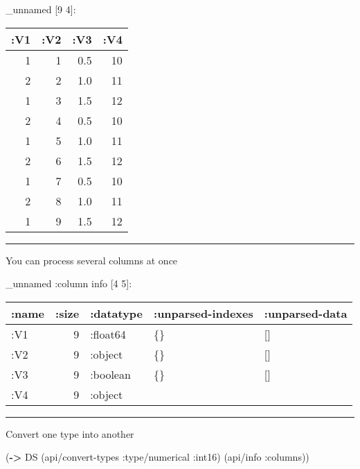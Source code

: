 \documentclass[]{article}
\newenvironment{Shaded}{\begin{snugshade}}{\end{snugshade}}
\newcommand{\KeywordTok}[1]{\textcolor[rgb]{0.13,0.29,0.53}{\textbf{#1}}}
\newcommand{\FloatTok}[1]{\textcolor[rgb]{0.00,0.00,0.81}{#1}}
\newcommand{\VariableTok}[1]{\textcolor[rgb]{0.00,0.00,0.00}{#1}}
\newcommand{\AttributeTok}[1]{\textcolor[rgb]{0.77,0.63,0.00}{#1}}
\newcommand{\NormalTok}[1]{#1}
\begin{document}
\_unnamed {[}9 4{]}:

\begin{longtable}[]{@{}rrrr@{}}
\toprule
:V1 & :V2 & :V3 & :V4\tabularnewline
\midrule
\endhead
1 & 1 & 0.5 & 10\tabularnewline
2 & 2 & 1.0 & 11\tabularnewline
1 & 3 & 1.5 & 12\tabularnewline
2 & 4 & 0.5 & 10\tabularnewline
1 & 5 & 1.0 & 11\tabularnewline
2 & 6 & 1.5 & 12\tabularnewline
1 & 7 & 0.5 & 10\tabularnewline
2 & 8 & 1.0 & 11\tabularnewline
1 & 9 & 1.5 & 12\tabularnewline
\bottomrule
\end{longtable}

\begin{center}\rule{0.5\linewidth}{0.5pt}\end{center}

You can process several columns at once

\begin{Shaded}
\end{Shaded}

\_unnamed :column info {[}4 5{]}:

\begin{longtable}[]{@{}lrlll@{}}
\toprule
:name & :size & :datatype & :unparsed-indexes &
:unparsed-data\tabularnewline
\midrule
\endhead
:V1 & 9 & :float64 & \{\} & {[}{]}\tabularnewline
:V2 & 9 & :object & \{\} & {[}{]}\tabularnewline
:V3 & 9 & :boolean & \{\} & {[}{]}\tabularnewline
:V4 & 9 & :object & &\tabularnewline
\bottomrule
\end{longtable}

\begin{center}\rule{0.5\linewidth}{0.5pt}\end{center}

Convert one type into another

\begin{Shaded}
\begin{Highlighting}[]
\NormalTok{(}\KeywordTok{->}\NormalTok{ DS}
\NormalTok{    (api/convert-types }\AttributeTok{:type/numerical} \AttributeTok{:int16}\NormalTok{)}
\NormalTok{    (api/info }\AttributeTok{:columns}\NormalTok{))}
\end{Highlighting}
\end{Shaded}
\end{document}
